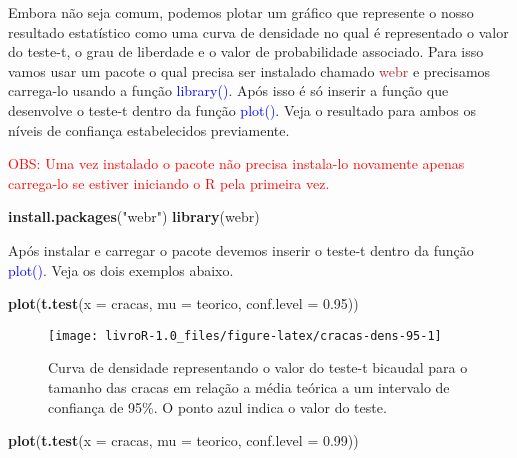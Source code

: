 \documentclass[14pt,titlepage, oneside, openany, a4paper]{book}
\newenvironment{Shaded}{\begin{snugshade}}{\end{snugshade}}
\newcommand{\DataTypeTok}[1]{\textcolor[rgb]{0.13,0.29,0.53}{#1}}
\newcommand{\FloatTok}[1]{\textcolor[rgb]{0.00,0.00,0.81}{#1}}
\newcommand{\KeywordTok}[1]{\textcolor[rgb]{0.13,0.29,0.53}{\textbf{#1}}}
\newcommand{\NormalTok}[1]{#1}
\newcommand{\StringTok}[1]{\textcolor[rgb]{0.31,0.60,0.02}{#1}}
\begin{document}
Embora não seja comum, podemos plotar um gráfico que represente o nosso resultado estatístico como uma curva de densidade no qual é representado o valor do teste-t, o grau de liberdade e o valor de probabilidade associado. Para isso vamos usar um pacote o qual precisa ser instalado chamado \textcolor{brown}{webr} e precisamos carrega-lo usando a função \textcolor{blue}{library()}. Após isso é só inserir a função que desenvolve o teste-t dentro da função \textcolor{blue}{plot()}. Veja o resultado para ambos os níveis de confiança estabelecidos previamente.

\textcolor{red}{OBS: Uma vez instalado o pacote não precisa instala-lo novamente apenas carrega-lo se estiver iniciando o R pela primeira vez.}

\begin{Shaded}
\begin{Highlighting}[]
\KeywordTok{install.packages}\NormalTok{(}\StringTok{"webr"}\NormalTok{)}
\KeywordTok{library}\NormalTok{(webr)}
\end{Highlighting}
\end{Shaded}

Após instalar e carregar o pacote devemos inserir o teste-t dentro da função \textcolor{blue}{plot()}. Veja os dois exemplos abaixo.

\begin{Shaded}
\begin{Highlighting}[]
\KeywordTok{plot}\NormalTok{(}\KeywordTok{t.test}\NormalTok{(}\DataTypeTok{x =}\NormalTok{ cracas, }\DataTypeTok{mu =}\NormalTok{ teorico, }\DataTypeTok{conf.level =} \FloatTok{0.95}\NormalTok{))}
\end{Highlighting}
\end{Shaded}

\begin{figure}[H]

{\centering \texttt{[image: livroR-1.0\_files/figure-latex/cracas-dens-95-1]} 

}

\caption{Curva de densidade representando o valor do teste-t bicaudal para o tamanho das cracas em relação a média teórica a um intervalo de confiança de 95\%. O ponto azul indica o valor do teste.}\label{fig:cracas-dens-95}
\end{figure}

\begin{Shaded}
\begin{Highlighting}[]
\KeywordTok{plot}\NormalTok{(}\KeywordTok{t.test}\NormalTok{(}\DataTypeTok{x =}\NormalTok{ cracas, }\DataTypeTok{mu =}\NormalTok{ teorico, }\DataTypeTok{conf.level =} \FloatTok{0.99}\NormalTok{))}
\end{Highlighting}
\end{Shaded}
\end{document}
